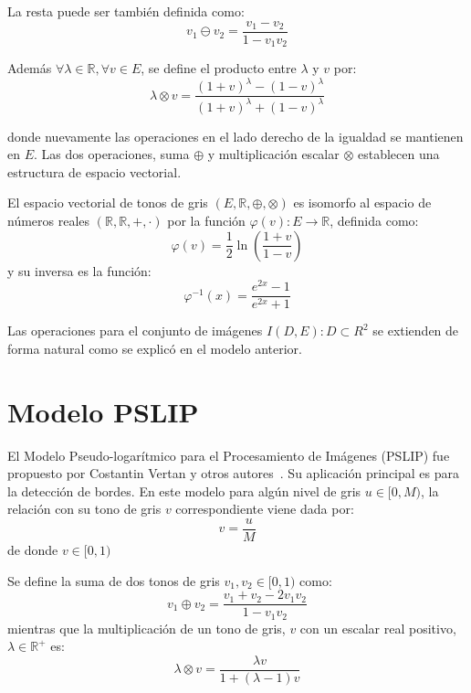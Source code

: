 La resta puede ser tambi\'en definida como:
\begin{equation}
	v_1\ominus v_2=\frac{v_1-v_2}{1-v_1v_2}
\end{equation}

Adem\'as $\forall \lambda \in \mathbb{R}, \forall v \in E $, se define el producto entre $\lambda$ y $v$ por:
\begin{equation}
	\lambda \otimes v =\frac{(1+v)^\lambda-(1-v)^\lambda}{(1+v)^\lambda+(1-v)^\lambda}
\end{equation}

donde nuevamente las operaciones en el lado derecho de la igualdad se mantienen en $E$. Las dos operaciones, suma $\oplus$ y multiplicación escalar $\otimes$ establecen una estructura de espacio vectorial.

El espacio vectorial de tonos de gris $(E, \mathbb{R}, \oplus, \otimes)$ es isomorfo al espacio de números reales $(\mathbb{R},\mathbb{R}, +, \cdot)$ por la función $\varphi(v) : E \rightarrow \mathbb{R}$, definida como:
\begin{equation}
	\varphi(v)=\frac{1}{2}\ln\left(\frac{1+v}{1-v}\right)
\end{equation}
y su inversa es la funci\'on:
\begin{equation}
	\varphi^{-1}(x)=\frac{e^{2x}-1}{e^{2x}+1}
\end{equation}

Las operaciones para el conjunto de im\'agenes $I(D,E):D\subset R^2$ se extienden de forma natural como se explic\'o en el modelo anterior.

\section{Modelo PSLIP}

El Modelo Pseudo-logar\'itmico para el Procesamiento de Im\'agenes (PSLIP) fue propuesto por Costantin Vertan y otros autores~\cite{vertan2008pseudo}. Su aplicaci\'on principal es para la detecci\'on de bordes. En este modelo para alg\'un nivel de gris $u\in[0,M)$, la relaci\'on con su tono de gris $v$ correspondiente viene dada por:
\begin{equation}
	v = \frac{u}{M}
\end{equation}
de donde $v\in[0,1)$

Se define la suma de dos tonos de gris $v_1,v_2\in[0,1)$ como:
\begin{equation}
	v_1\oplus v_2=\frac{v_1 + v_2 - 2v_1v_2}{1-v_1v_2}
\end{equation}
mientras que la multiplicación de un tono de gris, $v$ con un escalar real positivo, $\lambda \in \mathbb{R}^+$ es:
\begin{equation}
	\lambda \otimes v = \frac{\lambda v}{1+(\lambda-1)v}
\end{equation}

